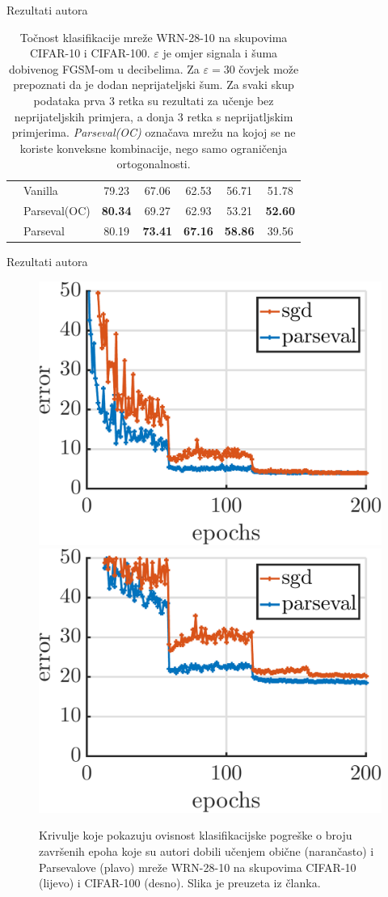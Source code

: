 \documentclass{beamer}
\begin{document}
\begin{frame}{Rezultati autora}
\begin{table}[h!]
\begin{center}
\begin{tabular}{|c|l|c|c|c|c|c|}
			\cline{2-7}
			\cline{2-7}
			& Vanilla
			& 79.23         & 67.06         & 62.53         & 56.71         & 51.78      \\
			& Parseval(OC)
			& \textbf{80.34}         & 69.27         & 62.93         & 53.21         & \textbf{52.60}      \\
			& Parseval
			& 80.19          & \textbf{73.41}         & \textbf{67.16}         & \textbf{58.86}         & 39.56      \\
			\hline
		\end{tabular}
		\egroup
	\end{center}
	\caption{
		Točnost klasifikacije mreže WRN-28-10 na skupovima CIFAR-10 i CIFAR-100. $\varepsilon$ je omjer signala i šuma dobivenog FGSM-om u decibelima. Za $\varepsilon=30$ čovjek može prepoznati da je dodan neprijateljski šum. Za svaki skup podataka prva 3 retka su rezultati za učenje bez neprijateljskih primjera, a donja 3 retka s neprijatljskim primjerima. \emph{Parseval(OC)} označava mrežu na kojoj se ne koriste konveksne kombinacije, nego samo ograničenja ortogonalnosti.
	}\label{tab:adv-robustness}
\end{table}
\end{frame}


\begin{frame}{Rezultati autora}
\begin{figure}[htbp]
	\centering
	\includegraphics[width=0.49\linewidth]{ilustracije/convergence/cifar10.pdf}
	\includegraphics[width=0.49\linewidth]{ilustracije/convergence/cifar100.pdf}
	\caption{
		Krivulje koje pokazuju ovisnost klasifikacijske pogreške o broju završenih epoha koje su autori dobili učenjem obične (narančasto) i Parsevalove (plavo) mreže WRN-28-10 na skupovima CIFAR-10 (lijevo) i CIFAR-100 (desno). Slika je preuzeta iz članka.
	}
	\label{fig:krivulje-pogreske}
\end{figure}
\end{frame}
\end{document}
